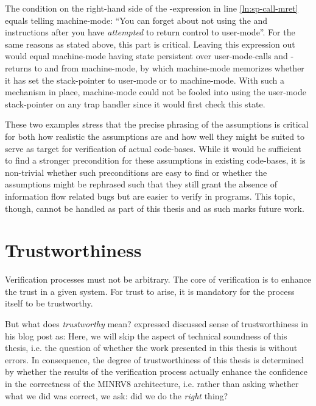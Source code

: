 The condition  on the right-hand side of the -expression in line \ref{ln:sp-call-mret} equals telling machine-mode: \enquote{You can forget about not using the  and  instructions after you have \textit{attempted} to return control to user-mode}.
For the same reasons as stated above, this part is critical.
Leaving this expression out would equal machine-mode having state persistent over user-mode-calls and -returns to and from machine-mode, by which machine-mode memorizes whether it has set the stack-pointer to user-mode or to machine-mode.
With such a mechanism in place, machine-mode could not be fooled into using the user-mode stack-pointer on any trap handler since it would first check this state.

These two examples stress that the precise phrasing of the assumptions is critical for both how realistic the assumptions are and how well they might be suited to serve as target for verification of actual code-bases.
While it would be sufficient to find a stronger precondition for these assumptions in existing code-bases, it is non-trivial whether such preconditions are easy to find or whether the assumptions might be rephrased such that they still grant the absence of information flow related bugs but are easier to verify in programs.
This topic, though, cannot be handled as part of this thesis and as such marks future work.

\section{Trustworthiness}
\label{sec:trustworthiness}

Verification processes must not be arbitrary.
The core of verification is to enhance the trust in a given system.
For trust to arise, it is mandatory for the process itself to be trustworthy.

But what does \textit{trustworthy} mean?
\citeauthor{Piano} expressed discussed sense of trustworthiness in his blog post  as:
Here, we will skip the aspect of technical soundness of this thesis, i.e. the question of whether the work presented in this thesis is without errors.
In consequence, the degree of trustworthiness of this thesis is determined by whether the results of the verification process actually enhance the confidence in the correctness of the MINRV8 architecture, i.e. rather than asking whether what we did was correct, we ask: did we do the \textit{right} thing?

